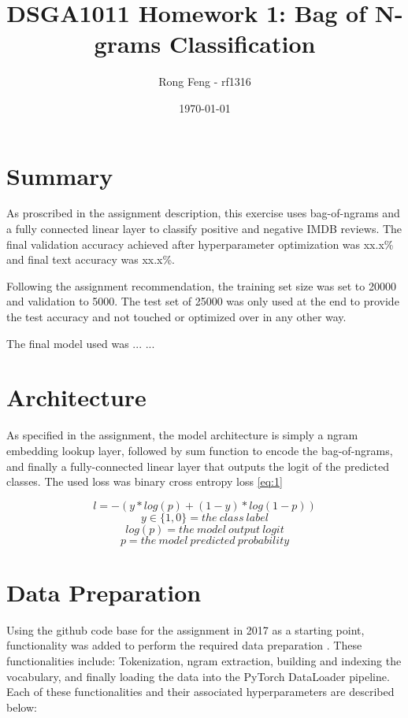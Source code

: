 \documentclass[a4paper,10pt]{article}
\title{DSGA1011 Homework 1: Bag of N-grams Classification}
\author{Rong Feng - rf1316}
\date{\printdayoff\today}
\begin{document}
\maketitle

\section{Summary}
\par 
\justify
As proscribed in the assignment description, this exercise uses bag-of-ngrams and a fully connected linear layer to classify positive and negative IMDB reviews. The final validation accuracy achieved after hyperparameter optimization was xx.x\% and final text accuracy was xx.x\%.

\par
\justify
Following the assignment recommendation, the training set size was set to 20000 and validation to 5000. The test set of 25000 was only used at the end to provide the test accuracy and not touched or optimized over in any other way.

\par
\justify
The final model used was ... ...


\section{Architecture}
As specified in the assignment, the model architecture is simply a ngram embedding lookup layer, followed by sum function to encode the bag-of-ngrams, and finally a fully-connected linear layer that outputs the logit of the predicted classes. The used loss was binary cross entropy loss \eqref{eq:1}

\begin{equation}
l = -(y*log(p) + (1-y)*log(1-p))\label{eq:1}
\end{equation}
\begin{equation*}
y \in{\{1,0\}} = the\ class\ label
\end{equation*}
\begin{equation*}
log(p) = the\ model\ output\ logit
\end{equation*}
\begin{equation*}
p = the\ model\ predicted\ probability
\end{equation*}

\section{Data Preparation}
\par
\justify
Using the github code base for the assignment in 2017 as a starting point, functionality was added to perform the required data preparation \cite{repo2017}. These functionalities include: Tokenization, ngram extraction, building and indexing the vocabulary, and finally loading the data into the PyTorch DataLoader pipeline. Each of these functionalities and their associated hyperparameters are described below:
\end{document}

